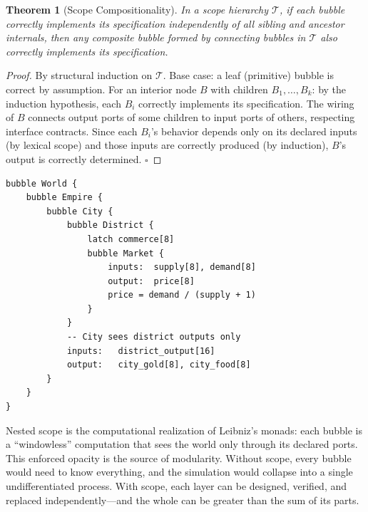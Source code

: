 \documentclass[11pt,a4paper,openany]{book}
\theoremstyle{plain}
\newtheorem{theorem}{Theorem}[chapter]
\theoremstyle{definition}
\theoremstyle{remark}
\newenvironment{implementation}{%
  \begin{mdframed}[
    linecolor=sphereamber!80, backgroundcolor=sphereamber!5,
    linewidth=1pt, innertopmargin=8pt, innerbottommargin=8pt,
    innerleftmargin=10pt, innerrightmargin=10pt,
    skipabove=10pt, skipbelow=6pt
  ]%
  \setlength{\parindent}{0pt}%
  \noindent{\textcolor{sphereamber!80!black}{\textbf{Implementation}}}\par\smallskip\ignorespaces
}{\end{mdframed}}
\newenvironment{perspective}{%
  \begin{mdframed}[
    linecolor=spherered!40, backgroundcolor=spherered!4,
    linewidth=1pt, innertopmargin=8pt, innerbottommargin=8pt,
    innerleftmargin=10pt, innerrightmargin=10pt,
    skipabove=10pt, skipbelow=6pt
  ]%
  \setlength{\parindent}{0pt}%
  \noindent{\textcolor{spherered}{\textbf{Perspective}}}\par\smallskip\ignorespaces
}{\end{mdframed}}
\begin{document}
\begin{theorem}[Scope Compositionality]
  In a scope hierarchy $\mathcal{T}$, if each bubble correctly implements
  its specification independently of all sibling and ancestor internals,
  then any composite bubble formed by connecting bubbles in $\mathcal{T}$
  also correctly implements its specification.
\end{theorem}
\begin{proof}
  By structural induction on $\mathcal{T}$. Base case: a leaf
  (primitive) bubble is correct by assumption. For an interior node $B$
  with children $B_1, \ldots, B_k$: by the induction hypothesis, each
  $B_i$ correctly implements its specification. The wiring of $B$
  connects output ports of some children to input ports of others,
  respecting interface contracts. Since each $B_i$'s behavior depends
  only on its declared inputs (by lexical scope) and those inputs are
  correctly produced (by induction), $B$'s output is correctly
  determined. $\square$
\end{proof}

\begin{implementation}
\begin{lstlisting}[caption={Nested city-district economy}]
bubble World {
    bubble Empire {
        bubble City {
            bubble District {
                latch commerce[8]
                bubble Market {
                    inputs:  supply[8], demand[8]
                    output:  price[8]
                    price = demand / (supply + 1)
                }
            }
            -- City sees district outputs only
            inputs:   district_output[16]
            output:   city_gold[8], city_food[8]
        }
    }
}
\end{lstlisting}
\end{implementation}

\begin{perspective}
  Nested scope is the computational realization of Leibniz's monads:
  each bubble is a ``windowless'' computation that sees the world only
  through its declared ports. This enforced opacity is the source of
  modularity. Without scope, every bubble would need to know everything,
  and the simulation would collapse into a single undifferentiated
  process. With scope, each layer can be designed, verified, and replaced
  independently---and the whole can be greater than the sum of its parts.
\end{perspective}
\end{document}

